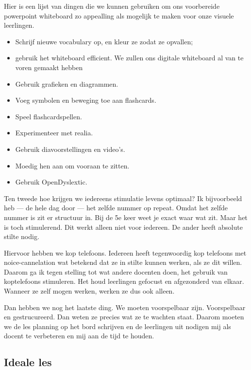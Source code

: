 \documentclass{article}
\begin{document}
            Hier is een lijst van dingen die we kunnen gebruiken om ons voorbereide powerpoint whiteboard zo appealling als mogelijk te maken voor onze visuele leerlingen.
            
            \begin{itemize}
                \setlength\itemsep{0em}
                \item Schrijf nieuwe vocabulary op, en kleur ze zodat ze opvallen;
                \item gebruik het whiteboard efficient. We zullen ons digitale whiteboard al van te voren gemaakt hebben
                \item Gebruik grafieken en diagrammen.
                \item Voeg symbolen en beweging toe aan flashcards.
                \item Speel flashcardspellen.
                \item Experimenteer met realia.
                \item Gebruik diavoorstellingen en video's.
                \item Moedig hen aan om vooraan te zitten.
                \item Gebruik OpenDyslextic.
            \end{itemize}
            
            Ten tweede hoe krijgen we iedereens stimulatie levens optimaal? Ik bijvoorbeeld heb — de hele dag door — het zelfde nummer op repeat. Omdat het zelfde nummer is zit er structuur in. Bij de 5e keer weet je exact waar wat zit. Maar het is toch stimulerend. Dit werkt alleen niet voor iedereen. De ander heeft absolute stilte nodig.
            
            Hiervoor hebben we kop telefoons. Iedereen heeft tegenwoordig kop telefoons met noice-cannelation wat betekend dat ze in stilte kunnen werken, als ze dit willen. Daarom ga ik tegen stelling tot wat andere docenten doen, het gebruik van koptelefoons stimuleren. Het houd leerlingen gefocust en afgezonderd van elkaar. Wanneer ze zelf mogen werken, werken ze dus ook alleen.
            
            Dan hebben we nog het laatste ding. We moeten voorspelbaar zijn. Voorspelbaar en gestrucureerd. Dan weten ze precies wat ze te wachten staat. Daarom moeten we de les planning op het bord schrijven en de leerlingen uit nodigen mij als docent te verbeteren en mij aan de tijd te houden. 
        
        \subsection{Ideale les}
            
\end{document}

